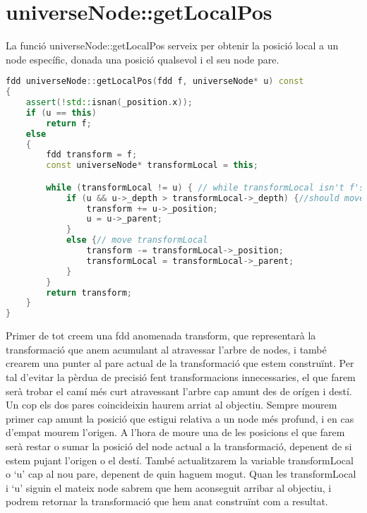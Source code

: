 \section{universeNode::getLocalPos}
La funció universeNode::getLocalPos serveix per obtenir la posició local a un node específic, donada una posició qualsevol i el seu node pare.
\begin{lstlisting}[language=C++]
fdd universeNode::getLocalPos(fdd f, universeNode* u) const
{
	assert(!std::isnan(_position.x));
	if (u == this)
		return f;
	else
	{
		fdd transform = f;
		const universeNode* transformLocal = this;

		while (transformLocal != u) { // while transformLocal isn't f's parent (u)
			if (u && u->_depth > transformLocal->_depth) {//should move u
				transform += u->_position;
				u = u->_parent;
			}
			else {// move transformLocal
				transform -= transformLocal->_position;
				transformLocal = transformLocal->_parent;
			}
		}
		return transform;
	}
}
\end{lstlisting}
Primer de tot creem una fdd anomenada transform, que representarà la transformació que anem acumulant al atravessar l'arbre de nodes, i també crearem una punter al pare actual de la transformació que estem construïnt.
Per tal d'evitar la pèrdua de precisió fent transformacions innecessaries, el que farem serà trobar el camí més curt atravessant l'arbre cap amunt des de orígen i destí. Un cop els dos pares coincideixin haurem arriat al objectiu.
Sempre mourem primer cap amunt la posició que estigui relativa a un node més profund, i en cas d'empat mourem l'origen. A l'hora de moure una de les posicions el que farem serà restar o sumar la posició del node actual a la transformació, depenent de si estem pujant l'origen o el destí. També actualitzarem la variable transformLocal o `u' cap al nou pare, depenent de quin haguem mogut.
Quan les transformLocal i `u' siguin el mateix node sabrem que hem aconseguit arribar al objectiu, i podrem retornar la transformació que hem anat construïnt com a resultat.

